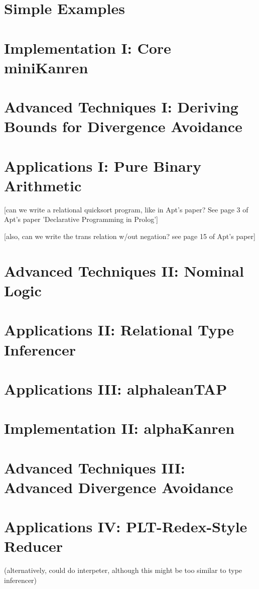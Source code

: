 \chapter{Simple Examples}

\chapter{Implementation I:  Core miniKanren}

\chapter{Advanced Techniques I:  Deriving Bounds for Divergence Avoidance}

\chapter{Applications I:  Pure Binary Arithmetic}

[can we write a relational quicksort program, like in Apt's paper?
See page 3 of Apt's paper 'Declarative Programming in Prolog']

[also, can we write the trans relation w/out negation?  see page 15 of
Apt's paper]

\chapter{Advanced Techniques II:  Nominal Logic}

\chapter{Applications II:  Relational Type Inferencer}

\chapter{Applications III:  alphaleanTAP}

\chapter{Implementation II:  alphaKanren}

\chapter{Advanced Techniques III:  Advanced Divergence Avoidance}

\chapter{Applications IV:  PLT-Redex-Style Reducer} 
(alternatively, could do interpeter, although this might be too
similar to type inferencer)

